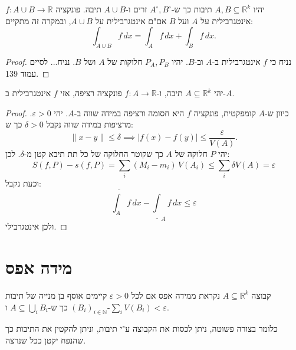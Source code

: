 \documentclass{tstextbook}
\begin{document}
\begin{proposition}
יהיו \(A,B\subseteq \mathbb{R}^k\) תיבות כך ש-\(A^{\circ},B^{\circ}\) זרים ו-\(A\cup B\) תיבה. פונקציה \(f: A\cup B\to\mathbb{R}\) אינטגרבילית על \(A\) ועל \(B\) אם"ם אינטגרבילית על \(A\cup B\), ובמקרה זה מתקיים:
$$\int_{A\cup B}f\,d x=\int_{A}f\,d x+\int_{B}f\,d x.$$

\end{proposition}
\begin{proof}
נניח כי \(f\) אינטגרבילית ב-\(A\) וב-\(B\). יהיו \(P_{A},P_{B}\) חלוקות של \(A\) ושל \(B\). נניח... לסיים עמוד 139.

\end{proof}
\begin{proposition}
יהי \(A\subseteq \mathbb{R}^k\) תיבה, ו-\(f:A\to\mathbb{R}\) פונקציה רציפה, אזי \(f\) אינטגרבילית ב-\(A\).

\end{proposition}
\begin{proof}
כיוון ש-\(A\) קומפקטית, פונקציה \(f\) היא חסומה ורציפה במידה שווה ב-\(A\).
יהי \(\varepsilon>0\). מרציפות במידה שווה נקבל \(\delta>0\) כך ש:
$$\|x-y\|\leq\delta\implies|f(x)-f(y)|\leq{\frac{\varepsilon}{V(A)}}.$$
יהי \(P\) חלוקה של \(A\) כך שקוטר החלוקה של כל תת תיבא קטן מ-\(\delta\). לכן:
$$S\left(f,P\right)-s(f,P)=\sum_{i}(M_{i}-m_{i})\,V(A_{i})\leq \sum_{i}\delta V(A)=\varepsilon$$
וכעת נקבל:
$${\overline{{\int_{A}}}}f\,d x-\underline{\int}_{A}f\,d x\leq\varepsilon$$
ולכן אינטגרבילי.

\end{proof}
\section{מידה אפס}

\begin{definition}
קבוצה \(A\subseteq \mathbb{R}^k\) נקראת ממידה אפס אם לכל \(\varepsilon>0\) קיימים אוסף בן מנייה של תיבות \((B_{i})_{i\in\mathbb{N}}\)  כך ש-\(A\subseteq \bigcup_{i}B_{i}\) ו-\(\sum_{i}V(B_{i})<\varepsilon\).

\end{definition}
כלומר בצורה פשוטה, ניתן לכסות את הקבוצה ע"י תיבות, וניתן להקטין את התיבות כך שהנפח יקטן ככל שנרצה.
\end{document}
